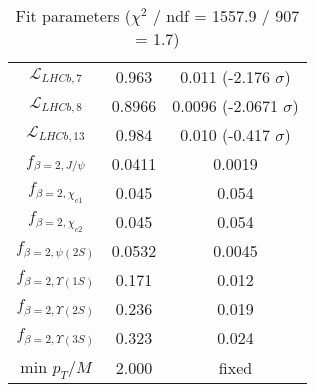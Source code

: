 \begin{table}[h!]
\begin{tabular}{c|c|c}
$\mathcal L_{LHCb,7}$ & 0.963 & 0.011 (-2.176 $\sigma$) \\
$\mathcal L_{LHCb,8}$ & 0.8966 & 0.0096 (-2.0671 $\sigma$) \\
$\mathcal L_{LHCb,13}$ & 0.984 & 0.010 (-0.417 $\sigma$) \\
$f_{\beta=2,J/\psi}$ & 0.0411 & 0.0019 \\
$f_{\beta=2,\chi_{c1}}$ & 0.045 & 0.054 \\
$f_{\beta=2,\chi_{c2}}$ & 0.045 & 0.054 \\
$f_{\beta=2,\psi(2S)}$ & 0.0532 & 0.0045 \\
$f_{\beta=2,\Upsilon(1S)}$ & 0.171 & 0.012 \\
$f_{\beta=2,\Upsilon(2S)}$ & 0.236 & 0.019 \\
$f_{\beta=2,\Upsilon(3S)}$ & 0.323 & 0.024 \\
min $p_T/M$ & 2.000 & fixed \\
\end{tabular}
\caption{Fit parameters ($\chi^2$ / ndf = 1557.9 / 907 = 1.7)}
\end{table}
